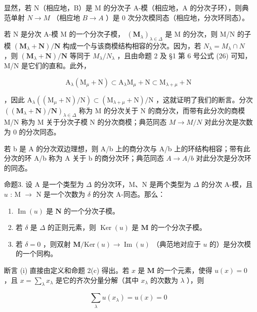 显然，若 N（相应地，B）是 M 的分次子 A-模（相应地，A 的分次子环），则典范单射 \(N \rightarrow M\) （相应地 \(B \rightarrow A\) ）是 0 次分次模同态（相应地，分次环同态）。

若 N 是分次 A-模 M 的一个分次子模， \((\mathbf{M}_{\lambda})_{\lambda\in\Delta}\) 是 M 的分次，则 M/N 的子模 \((\mathbf{M}_{\lambda}+\mathbf{N})/\mathbf{N}\) 构成一个与该商模结构相容的分次。因为，若 \(N_{\lambda}=M_{\lambda}\cap N\) ，则 \((\mathbf{M}_{\lambda}+\mathbf{N})/\mathbf{N}\) 等同于 \(M_{\lambda}/N_{\lambda}\) ，且由命题 2 及 §1 第 6 号公式 (26) 可知，M/N 是它们的直和。此外，

\[
\mathrm{A} _ {\lambda} (\mathrm{M} _ {\mu} + \mathrm{N}) \subset \mathrm{A} _ {\lambda} \mathrm{M} _ {\mu} + \mathrm{N} \subset \mathrm{M} _ {\lambda + \mu} + \mathrm{N}
\]

，因此 \(\mathrm{A}_{\lambda}((\mathrm{M}_{\mu}+\mathrm{N})/\mathrm{N})\subset(\mathrm{M}_{\lambda+\mu}+\mathrm{N})/\mathrm{N}\) ，这就证明了我们的断言。分次 \(((\mathbf{M}_{\lambda} + \mathbf{N})/\mathbf{N})_{\lambda \in \Delta}\) 称为 M 的分次关于 N 的商分次，而带有此分次的商模 M/N 称为 M 关于分次子模 N 的分次商模；典范同态 \(M \to M/N\) 对此分次是次数为 0 的分次同态。

若 b 是 A 的分次双边理想，则 A/b 上的商分次与 A/b 上的环结构相容；带有此分次的环 A/b 称为 A 关于 b 的商分次环；典范同态 \(A \rightarrow A/b\) 对此分次是分次环的同态。

命题3. 设 A 是一个类型为 \(\Delta\) 的分次环，M、N 是两个类型为 \(\Delta\) 的分次 A-模，且 \(u\) : M \(\rightarrow\) N 是一个次数为 \(\delta\) 的分次 A-同态。那么：

\begin{enumerate}
\def\labelenumi{(\roman{enumi})}
\item
  \(\operatorname{Im}(u)\) 是 \(\mathbf{N}\) 的一个分次子模。
\item
  若 \(\delta\) 是 \(\Delta\) 的正则元素，则 \(\operatorname{Ker}(u)\) 是 \(\mathbf{M}\) 的一个分次子模。
\item
  若 \(\delta = 0\) ，则双射 \(\mathbf{M} / \mathrm{Ker}(u) \to \operatorname{Im}(u)\) （典范地对应于 \(u\) 的）是分次模的一个同构。
\end{enumerate}

断言 (i) 直接由定义和命题 2(c) 得出。若 \(x\) 是 \(\mathbf{M}\) 的一个元素，使得 \(u(x) = 0\) ，且 \(x = \sum_{\lambda} x_{\lambda}\) 是它的齐次分量分解（其中 \(x_{\lambda}\) 的次数为 \(\lambda\) ），则

\[
\sum_ {\lambda} u (x _ {\lambda}) = u (x) = 0
\]


